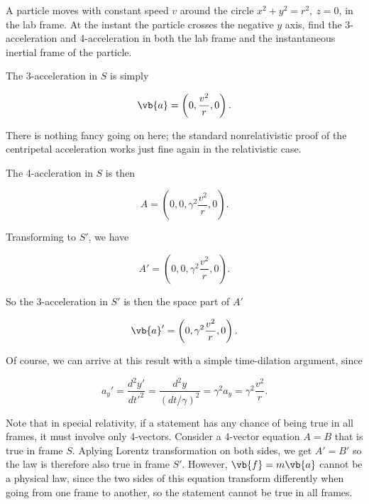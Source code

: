 \documentclass[english,a4paper,12pt]{report}
\begin{document}
{A particle moves with constant speed \(v\) around the circle \(x^2+y^2=r^2, ~z=0\), in the lab frame. At the instant the particle crosses the negative \(y\) axis, find the 3-acceleration and 4-acceleration in both the lab frame and the instantaneous inertial frame of the particle. }
{The 3-acceleration in \(S\) is simply

\begin{equation}
    \vb{a} = \left(0,\frac{v^2}{r}, 0 \right).
\end{equation}

There is nothing fancy going on here; the standard nonrelativistic proof of the centripetal acceleration works just fine again in the relativistic case. 

The 4-accleration in \(S\) is then 

\begin{equation}
    A = \left(0,0,\gamma ^2\frac{v^2}{r}, 0 \right).
\end{equation}

Transforming to \(S'\), we have 

\begin{equation}
    A' = \left(0,0, \gamma ^2 \frac{v^2}{r}, 0 \right).
\end{equation}

So the 3-acceleration in \(S'\) is then the space part of \(A'\)

\begin{equation}
    \vb{a} ' = \left(0,\gamma ^2\frac{v^2}{r}, 0 \right).
\end{equation}

Of course, we can arrive at this result with a simple time-dilation argument, since

\begin{equation}
    a_{y}' = \frac{d^2y'}{dt'^2} = \frac{d^2y}{(dt /\gamma ) ^2} = \gamma ^2 a_{y} = \gamma ^2 \frac{v^2}{r}.     
\end{equation}
}

Note that in special relativity, if a statement has any chance of being true in all frames, it must involve only 4-vectors. Consider a 4-vector equation \(A = B\) that is true in frame \(S\). Aplying Lorentz transformation on both sides, we get \(A' = B'\) so the law is therefore also true in frame \(S'\). However, \(\vb{f} = m\vb{a} \) cannot be a physical law, since the two sides of this equation transform differently when going from one frame to another, so the statement cannot be true in all frames. 
\end{document}
